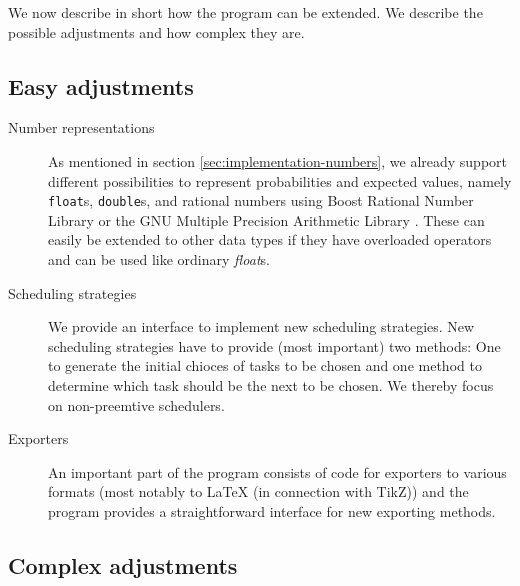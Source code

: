 We now describe in short how the program can be extended. We describe the possible adjustments and how complex they are.

\subsection{Easy adjustments}
\label{sec:implementation-extensions-easy}

\begin{description}
\item[Number representations] As mentioned in section \ref{sec:implementation-numbers}, we already support different possibilities to represent probabilities and expected values, namely \texttt{float}s, \texttt{double}s, and rational numbers using Boost Rational Number Library \cite{boostrational} or the GNU Multiple Precision Arithmetic Library \cite{gnumultiprecision}. These can easily be extended to other data types if they have overloaded operators and can be used like ordinary \emph{float}s.
\item[Scheduling strategies] We provide an interface to implement new scheduling strategies. New scheduling strategies have to provide (most important) two methods: One to generate the initial chioces of tasks to be chosen and one method to determine which task should be the next to be chosen. We thereby focus on non-preemtive schedulers.
\item[Exporters] An important part of the program consists of code for exporters to various formats (most notably to \LaTeX{} (in connection with TikZ)) and the program provides a straightforward interface for new exporting methods.
\end{description}

\subsection{Complex adjustments}
\label{sec:implementations-extensions-moderate}

